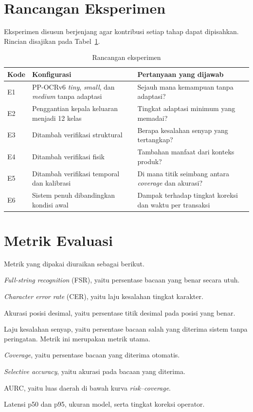 \section{Rancangan Eksperimen}

Eksperimen disusun berjenjang agar kontribusi setiap tahap dapat dipisahkan.
Rincian disajikan pada Tabel~\ref{tab:eksperimen}.

\begin{table}[H]
\caption{Rancangan eksperimen}
\label{tab:eksperimen}
\begin{tabularx}{\textwidth}{@{}p{0.8cm} p{5.2cm} X@{}}
\toprule
\textbf{Kode} & \textbf{Konfigurasi} & \textbf{Pertanyaan yang dijawab} \\
\midrule
E1 & PP-OCRv6 \textit{tiny}, \textit{small}, dan \textit{medium} tanpa adaptasi & Sejauh mana kemampuan tanpa adaptasi? \\
E2 & Penggantian kepala keluaran menjadi 12 kelas & Tingkat adaptasi minimum yang memadai? \\
E3 & Ditambah verifikasi struktural & Berapa kesalahan senyap yang tertangkap? \\
E4 & Ditambah verifikasi fisik & Tambahan manfaat dari konteks produk? \\
E5 & Ditambah verifikasi temporal dan kalibrasi & Di mana titik seimbang antara \textit{coverage} dan akurasi? \\
E6 & Sistem penuh dibandingkan kondisi awal & Dampak terhadap tingkat koreksi dan waktu per transaksi \\
\bottomrule
\end{tabularx}
\end{table}

\section{Metrik Evaluasi}

Metrik yang dipakai diuraikan sebagai berikut.
\begin{poin}
  \item \textit{Full-string recognition} (FSR), yaitu persentase bacaan yang
        benar secara utuh.
  \item \textit{Character error rate} (CER), yaitu laju kesalahan tingkat
        karakter.
  \item Akurasi posisi desimal, yaitu persentase titik desimal pada posisi yang
        benar.
  \item Laju kesalahan senyap, yaitu persentase bacaan salah yang diterima
        sistem tanpa peringatan. Metrik ini merupakan metrik utama.
  \item \textit{Coverage}, yaitu persentase bacaan yang diterima otomatis.
  \item \textit{Selective accuracy}, yaitu akurasi pada bacaan yang diterima.
  \item AURC, yaitu luas daerah di bawah kurva \textit{risk--coverage}.
  \item Latensi p50 dan p95, ukuran model, serta tingkat koreksi operator.
\end{poin}

